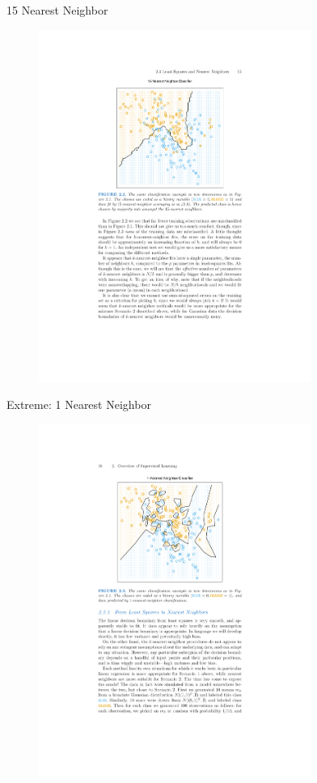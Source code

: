 \begin{frame}{15 Nearest Neighbor}
  \vspace{-15pt}
\begin{figure}[htbp]
\begin{center}
\includegraphics[width=3.5in]{./resources/classifier15nn.pdf}
\label{class15nn}
\end{center}
\end{figure}
\end{frame}

\begin{frame}{Extreme: 1 Nearest Neighbor}
\vspace{-15pt}

\begin{figure}[htbp]
\begin{center}
\includegraphics[width=3.5in]{./resources/classifier1nn.pdf}
\label{class15nn}
\end{center}
\end{figure}
\end{frame}

